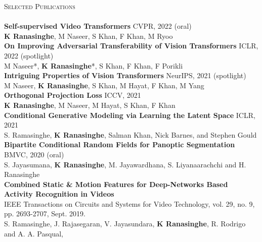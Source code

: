 \documentclass{article}
\newcommand{\lineunder} {
    \vspace*{-8pt} \\
    \hspace*{-18pt} \hrulefill \\
}
\newcommand{\header} [1] {
	\needspace{1em}
    {\hspace*{-18pt}\vspace*{6pt} \textsc{#1}}
    \vspace*{-6pt} \lineunder
}
\begin{document}
{%
\header{Selected Publications}
{
\textbf{Self-supervised Video Transformers} \hfill CVPR, 2022 (oral) \\
\textbf{K Ranasinghe}, M Naseer, S Khan, F Khan, M Ryoo \\
\vspace{2mm}
\textbf{On Improving Adversarial Transferability of Vision Transformers} \hfill ICLR, 2022 (spotlight) \\
M Naseer*, \textbf{K Ranasinghe}*, S Khan, F Khan, F Porikli \\
\vspace{2mm}
\textbf{Intriguing Properties of Vision Transformers} \hfill  NeurIPS, 2021 (spotlight)\\
M Naseer, \textbf{K Ranasinghe}, S Khan, M Hayat, F Khan, M Yang  \\
\vspace{2mm}
\textbf{Orthogonal Projection Loss} \hfill ICCV, 2021 \\
\textbf{K Ranasinghe}, M Naseer, M Hayat, S Khan, F Khan\\
\vspace{2mm}
\textbf{Conditional Generative Modeling via Learning the Latent Space} \hfill ICLR, 2021 \\
S. Ramasinghe, \textbf{K Ranasinghe},  Salman Khan, Nick Barnes, and Stephen Gould \\
\vspace{2mm}
\textbf{Bipartite Conditional Random Fields for Panoptic Segmentation} \hfill BMVC, 2020 (oral) \\
S. Jayasumana, \textbf{K Ranasinghe}, M. Jayawardhana, S. Liyanaarachchi and H. Ranasinghe \\
\vspace{2mm}
\textbf{Combined Static \& Motion Features for Deep-Networks Based Activity Recognition in Videos}\\
IEEE Transactions on Circuits and Systems for Video Technology, vol. 29, no. 9, pp. 2693-2707, Sept. 2019.\\
S. Ramasinghe, J. Rajasegaran, V. Jayasundara, \textbf{K Ranasinghe}, R. Rodrigo and A. A. Pasqual,\\
\vspace{2mm}
}}
\end{document}
